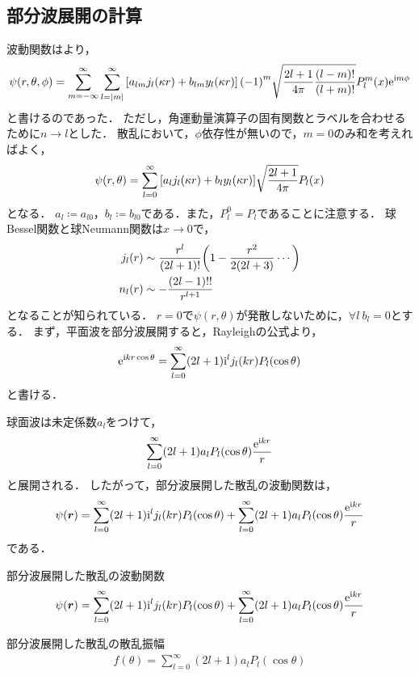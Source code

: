 \documentclass{report}
\begin{document}
  \subsection{部分波展開の計算}
    波動関数はより，
    \begin{align}
      \psi(r, \theta, \phi) = \sum_{m = -\infty}^{\infty}\sum_{l = \abs{m}}^{\infty}\qty[a_{lm}j_l(\kappa r) + b_{lm}y_l(\kappa r)](-1)^m\sqrt{\frac{2l + 1}{4\pi}\frac{(l - m)!}{(l + m)!}}P_l^m(x)\mathrm{e}^{\mathrm{i} m\phi}
    \end{align}
    と書けるのであった．
    ただし，角運動量演算子の固有関数とラベルを合わせるために$n \to l$とした．
    散乱において，$\phi$依存性が無いので，$m = 0$のみ和を考えればよく，
    \begin{align}
      \psi(r, \theta) = \sum_{l = 0}^{\infty}\qty[a_lj_l(\kappa r) + b_ly_l(\kappa r)]\sqrt{\frac{2l + 1}{4\pi}}P_l(x)
    \end{align} 
    となる．
    $a_l \coloneqq a_{l0}$，$b_l \coloneqq b_{l0}$である．また，$P_l^0 = P_l$であることに注意する．
    球Bessel関数と球Neumann関数は$x \to 0$で，
    \begin{align}
      j_l(r) &\sim \frac{r^l}{(2l + 1)!}\qty(1 - \frac{r^2}{2(2l + 3)}\cdots) \\
      n_l(r) &\sim -\frac{(2l - 1)!!}{r^{l + 1}}
    \end{align}
    となることが知られている．
    $r = 0$で$\psi(r, \theta)$が発散しないために，$\forall l\ b_l = 0$とする．
    まず，平面波を部分波展開すると，Rayleighの公式より，
    \begin{align}
      \mathrm{e}^{\mathrm{i} kr\cos\theta} = \sum_{l = 0}^{\infty} (2l + 1)\mathrm{i}^l j_l(kr)P_l(\cos\theta)
    \end{align}
    と書ける．
    \par
    球面波は未定係数$a_l$をつけて，
    \begin{align}
      \sum_{l = 0}^{\infty} (2l + 1)a_l P_l(\cos\theta) \frac{\mathrm{e}^{\mathrm{i} kr}}{r}
    \end{align}
    と展開される．
    したがって，部分波展開した散乱の波動関数は，
    \begin{align}
      \psi(\bm{r}) = \sum_{l = 0}^{\infty} (2l + 1)\mathrm{i}^l j_l(kr)P_l(\cos\theta) + \sum_{l = 0}^{\infty} (2l + 1)a_l P_l(\cos\theta) \frac{\mathrm{e}^{\mathrm{i} kr}}{r}
    \end{align}
    である．
    \begin{itembox}[l]{部分波展開した散乱の波動関数}
      \begin{align}
        \psi(\bm{r}) = \sum_{l = 0}^{\infty} (2l + 1)\mathrm{i}^l j_l(kr)P_l(\cos\theta) + \sum_{l = 0}^{\infty} (2l + 1)a_l P_l(\cos\theta) \frac{\mathrm{e}^{\mathrm{i} kr}}{r}\label{PartialWave}
      \end{align}
    \end{itembox}
    \begin{itembox}[l]{部分波展開した散乱の散乱振幅}
      \begin{align}
        f(\theta) = \sum_{l = 0}^{\infty} (2l + 1)a_l P_l(\cos\theta) \label{PartialWave-amp}
      \end{align}
    \end{itembox}
\end{document}
